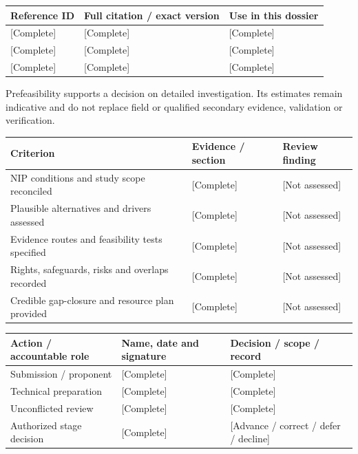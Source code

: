 {\sffamily\fontsize{8.3}{10.3}\selectfont\begin{longtable}{@{}P{29.69mm} P{82.48mm} P{52.79mm}@{}}
\toprule
\textbf{Reference ID} & \textbf{Full citation / exact version} & \textbf{Use in this dossier}\\\midrule\endhead
\rule{0pt}{7.7mm}[Complete] & [Complete] & [Complete]\\\hline
\rule{0pt}{7.7mm}[Complete] & [Complete] & [Complete]\\\hline
\rule{0pt}{7.7mm}[Complete] & [Complete] & [Complete]\\\hline
\end{longtable}}
\begin{Notice}Prefeasibility supports a decision on detailed investigation. Its estimates remain indicative and do not replace field or qualified secondary evidence, validation or verification.\end{Notice}
{\sffamily\fontsize{8.3}{10.3}\selectfont\begin{longtable}{@{}P{80.84mm} P{42.89mm} P{41.24mm}@{}}
\toprule
\textbf{Criterion} & \textbf{Evidence / section} & \textbf{Review finding}\\\midrule\endhead
\rule{0pt}{7.7mm}NIP conditions and study scope reconciled & [Complete] & [Not assessed]\\\hline
\rule{0pt}{7.7mm}Plausible alternatives and drivers assessed & [Complete] & [Not assessed]\\\hline
\rule{0pt}{7.7mm}Evidence routes and feasibility tests specified & [Complete] & [Not assessed]\\\hline
\rule{0pt}{7.7mm}Rights, safeguards, risks and overlaps recorded & [Complete] & [Not assessed]\\\hline
\rule{0pt}{7.7mm}Credible gap-closure and resource plan provided & [Complete] & [Not assessed]\\\hline
\end{longtable}}
{\sffamily\fontsize{8.3}{10.3}\selectfont\begin{longtable}{@{}P{51.14mm} P{56.09mm} P{57.74mm}@{}}
\toprule
\textbf{Action / accountable role} & \textbf{Name, date and signature} & \textbf{Decision / scope / record}\\\midrule\endhead
\rule{0pt}{7.7mm}Submission / proponent & [Complete] & [Complete]\\\hline
\rule{0pt}{7.7mm}Technical preparation & [Complete] & [Complete]\\\hline
\rule{0pt}{7.7mm}Unconflicted review & [Complete] & [Complete]\\\hline
\rule{0pt}{7.7mm}Authorized stage decision & [Complete] & [Advance / correct / defer / decline]\\\hline
\end{longtable}}
